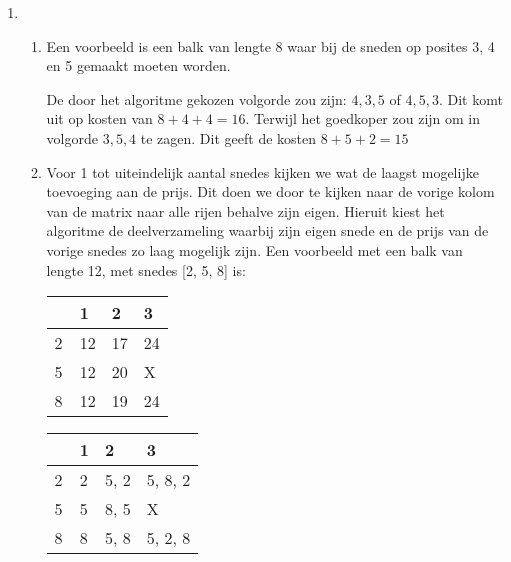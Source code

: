 \documentclass[11pt]{article}
\begin{document}
\begin{enumerate}
    \item
        \begin{enumerate}
            \item
                Een voorbeeld is een balk van lengte 8 waar bij de sneden op
                posites 3, 4 en 5 gemaakt moeten worden.

                De door het algoritme gekozen volgorde zou zijn: $4, 3, 5$ of
                $4, 5, 3$. Dit komt uit op kosten van $8+4+4=16$. Terwijl het
                goedkoper zou zijn om in volgorde $3, 5, 4$ te zagen. Dit geeft
                de kosten $8+5+2=15$

            \item
                Voor 1 tot uiteindelijk aantal snedes kijken we wat de
                laagst mogelijke toevoeging aan de prijs. Dit doen we door te
                kijken naar de vorige kolom van de matrix naar alle rijen
                behalve zijn eigen.
                \pagebreak 
                Hieruit kiest het algoritme de
                deelverzameling waarbij zijn eigen snede en de prijs van de vorige snedes zo laag mogelijk zijn. Een voorbeeld met een
                balk van lengte 12, met snedes [2, 5, 8] is:

                \begin{table}
                    \begin{tabular}{l|lll}
                    ~ & 1  & 2  & 3  \\ \hline
                    2 & 12 & 17 & 24 \\
                    5 & 12 & 20 & X  \\
                    8 & 12 & 19 & 24 \\
                    \end{tabular}
                \end{table}
                \begin{table}
                    \begin{tabular}{l|lll}
                    ~ & 1 & 2    & 3        \\ \hline
                    2 & 2 & 5, 2 & 5, 8, 2  \\
                    5 & 5 & 8, 5 & X        \\
                    8 & 8 & 5, 8 & 5, 2, 8  \\
                    \end{tabular}
                \end{table}


\end{enumerate}
\end{enumerate}
\end{document}

